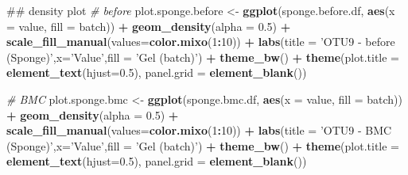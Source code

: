 \documentclass[]{book}
\newenvironment{Shaded}{\begin{snugshade}}{\end{snugshade}}
\newcommand{\KeywordTok}[1]{\textcolor[rgb]{0.13,0.29,0.53}{\textbf{#1}}}
\newcommand{\DataTypeTok}[1]{\textcolor[rgb]{0.13,0.29,0.53}{#1}}
\newcommand{\DecValTok}[1]{\textcolor[rgb]{0.00,0.00,0.81}{#1}}
\newcommand{\FloatTok}[1]{\textcolor[rgb]{0.00,0.00,0.81}{#1}}
\newcommand{\StringTok}[1]{\textcolor[rgb]{0.31,0.60,0.02}{#1}}
\newcommand{\CommentTok}[1]{\textcolor[rgb]{0.56,0.35,0.01}{\textit{#1}}}
\newcommand{\OperatorTok}[1]{\textcolor[rgb]{0.81,0.36,0.00}{\textbf{#1}}}
\newcommand{\NormalTok}[1]{#1}
\begin{document}
\begin{Shaded}
\begin{Highlighting}[]
\NormalTok{## density plot}
\CommentTok{# before}
\NormalTok{plot.sponge.before <-}\StringTok{ }\KeywordTok{ggplot}\NormalTok{(sponge.before.df, }\KeywordTok{aes}\NormalTok{(}\DataTypeTok{x =}\NormalTok{ value, }\DataTypeTok{fill =}\NormalTok{ batch)) }\OperatorTok{+}\StringTok{ }\KeywordTok{geom_density}\NormalTok{(}\DataTypeTok{alpha =} \FloatTok{0.5}\NormalTok{) }\OperatorTok{+}\StringTok{ }\KeywordTok{scale_fill_manual}\NormalTok{(}\DataTypeTok{values=}\KeywordTok{color.mixo}\NormalTok{(}\DecValTok{1}\OperatorTok{:}\DecValTok{10}\NormalTok{)) }\OperatorTok{+}\StringTok{ }\KeywordTok{labs}\NormalTok{(}\DataTypeTok{title =} \StringTok{'OTU9 - before (Sponge)'}\NormalTok{,}\DataTypeTok{x=}\StringTok{'Value'}\NormalTok{,}\DataTypeTok{fill =} \StringTok{'Gel (batch)'}\NormalTok{) }\OperatorTok{+}\StringTok{ }\KeywordTok{theme_bw}\NormalTok{() }\OperatorTok{+}\StringTok{ }\KeywordTok{theme}\NormalTok{(}\DataTypeTok{plot.title =} \KeywordTok{element_text}\NormalTok{(}\DataTypeTok{hjust=}\FloatTok{0.5}\NormalTok{), }\DataTypeTok{panel.grid =} \KeywordTok{element_blank}\NormalTok{())}

\CommentTok{# BMC}
\NormalTok{plot.sponge.bmc <-}\StringTok{ }\KeywordTok{ggplot}\NormalTok{(sponge.bmc.df, }\KeywordTok{aes}\NormalTok{(}\DataTypeTok{x =}\NormalTok{ value, }\DataTypeTok{fill =}\NormalTok{ batch)) }\OperatorTok{+}\StringTok{ }\KeywordTok{geom_density}\NormalTok{(}\DataTypeTok{alpha =} \FloatTok{0.5}\NormalTok{) }\OperatorTok{+}\StringTok{ }\KeywordTok{scale_fill_manual}\NormalTok{(}\DataTypeTok{values=}\KeywordTok{color.mixo}\NormalTok{(}\DecValTok{1}\OperatorTok{:}\DecValTok{10}\NormalTok{)) }\OperatorTok{+}\StringTok{ }\KeywordTok{labs}\NormalTok{(}\DataTypeTok{title =} \StringTok{'OTU9 - BMC (Sponge)'}\NormalTok{,}\DataTypeTok{x=}\StringTok{'Value'}\NormalTok{,}\DataTypeTok{fill =} \StringTok{'Gel (batch)'}\NormalTok{) }\OperatorTok{+}\StringTok{ }\KeywordTok{theme_bw}\NormalTok{() }\OperatorTok{+}\StringTok{ }\KeywordTok{theme}\NormalTok{(}\DataTypeTok{plot.title =} \KeywordTok{element_text}\NormalTok{(}\DataTypeTok{hjust=}\FloatTok{0.5}\NormalTok{), }\DataTypeTok{panel.grid =} \KeywordTok{element_blank}\NormalTok{())}



\end{Highlighting}
\end{Shaded}
\end{document}
